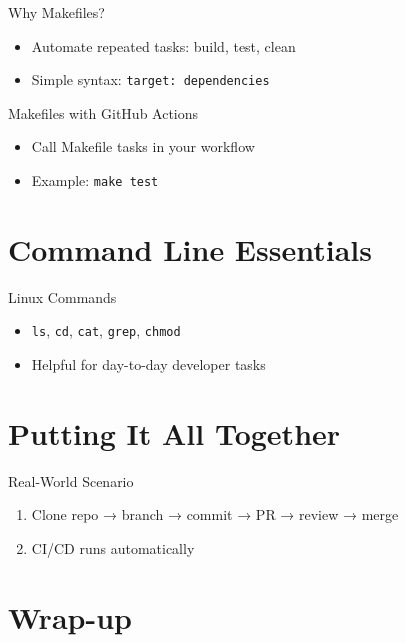 \documentclass[aspectratio=169]{beamer} %
\begin{document}
\begin{frame}{Why Makefiles?}
  \begin{itemize}
    \item Automate repeated tasks: build, test, clean
    \item Simple syntax: \texttt{target: dependencies}
  \end{itemize}
\end{frame}

\begin{frame}{Makefiles with GitHub Actions}
  \begin{itemize}
    \item Call Makefile tasks in your workflow
    \item Example: \texttt{make test}
  \end{itemize}
\end{frame}

\section{Command Line Essentials}

\begin{frame}{Linux Commands}
  \begin{itemize}
    \item \texttt{ls}, \texttt{cd}, \texttt{cat}, \texttt{grep}, \texttt{chmod}
    \item Helpful for day-to-day developer tasks
  \end{itemize}
\end{frame}

\section{Putting It All Together}

\begin{frame}{Real-World Scenario}
  \begin{enumerate}
    \item Clone repo → branch → commit → PR → review → merge
    \item CI/CD runs automatically
  \end{enumerate}
\end{frame}

\section{Wrap-up}
\end{document}
